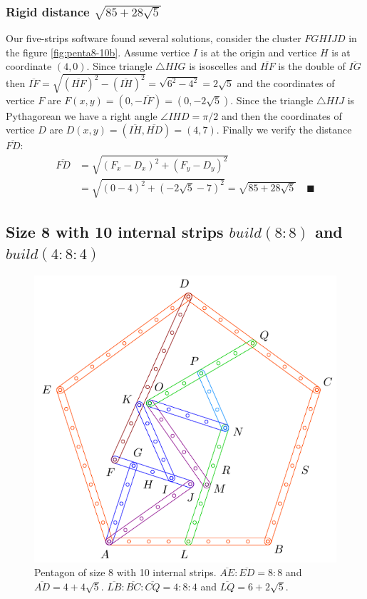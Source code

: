 \documentclass[11pt]{article}
\begin{document}
\subsubsection{Rigid distance $\sqrt{85 + 28\sqrt5}$}

Our five-strips software found several solutions, consider the cluster $FGHIJD$ in the figure \ref{fig:penta8-10b}. Assume vertice $I$ is at the origin and vertice $H$ is at coordinate $(4,0)$. Since triangle $\triangle{HIG}$ is isoscelles and $\overline{HF}$ is the double of $\overline{IG}$ then $\overline{IF} = \sqrt{(\overline{HF})^2 - (\overline{IH})^2} = \sqrt{6^2 - 4^2} = 2\sqrt{5}$ and the coordinates of vertice $F$ are $F(x,y) = (0,-\overline{IF}) = (0,-2\sqrt5)$. Since the triangle $\triangle{HIJ}$ is Pythagorean we have a right angle $\angle{IHD} = \pi / 2$ and then the coordinates of vertice $D$ are $D(x,y) = (\overline{IH},\overline{HD}) = (4,7)$. Finally we verify the distance $\overline{FD}$:
\begin{align}
\overline{FD} &= \sqrt{(F_x - D_x)^2 + (F_y - D_y)^2 } \nonumber\\
 &= \sqrt{(0 - 4)^2 + (-2\sqrt5 - 7)^2} = \sqrt{85 + 28\sqrt5} \quad \blacksquare
\end{align}

\subsection{Size 8 with 10 internal strips $build(8:8)$ and $build(4:8:4)$}

\begin{figure}[H]
\centering
\includegraphics[scale=1]{8/penta8-10c}
\caption{Pentagon of size 8 with 10 internal strips. $\overline{AE}:\overline{ED} = 8:8$ and $\overline{AD} = 4 + 4\sqrt5$. $\overline{LB}:\overline{BC}:\overline{CQ} = 4:8:4$ and $\overline{LQ} = 6 + 2\sqrt5$.}
\label{fig:penta8-10c}
\end{figure}
\end{document}
